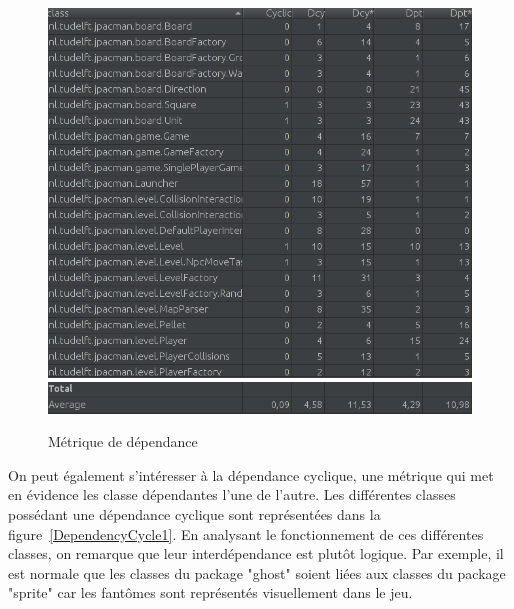 \documentclass[12pt, openany]{report}
\begin{document}
\begin{figure}[!h]
	\centering
	\includegraphics[scale=0.5]{Images/DependencyMetrics1.png}
	\includegraphics[scale=0.5]{Images/DependencyMetricsBis1.png}  
	\caption{Métrique de dépendance}
	\label{DependencyMetrics1}
\end{figure}
\newpage
 On peut également s’intéresser à la dépendance cyclique, une métrique qui met en évidence les classe dépendantes l'une de l'autre. Les différentes classes possédant une dépendance cyclique sont représentées dans la figure~\ref{DependencyCycle1}. En analysant le fonctionnement de ces différentes classes, on remarque que leur interdépendance est plutôt logique. Par exemple, il est normale que les classes du package "ghost" soient liées aux classes du package "sprite" car les fantômes sont représentés visuellement dans le jeu.
\end{document}
